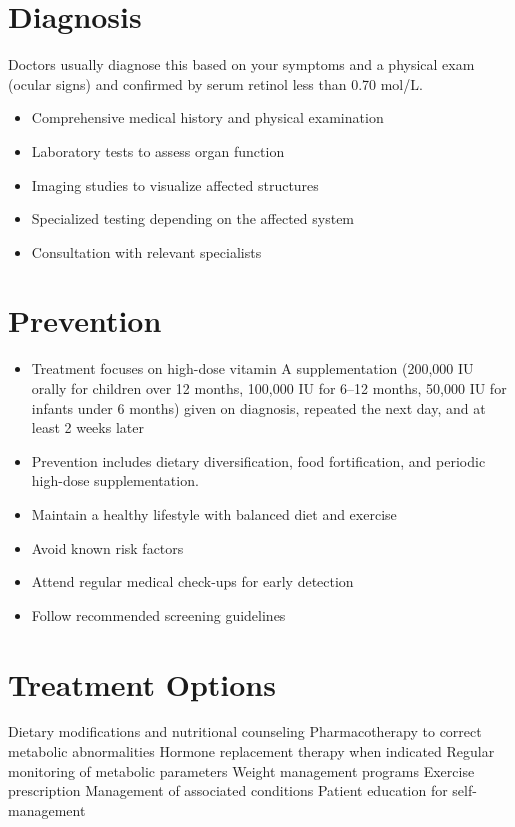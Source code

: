 \section{Diagnosis}
Doctors usually diagnose this based on your symptoms and a physical exam (ocular signs) and confirmed by serum retinol less than 0.70 \textmu mol/L.

\begin{itemize}[noitemsep]
  \item Comprehensive medical history and physical examination
  \item Laboratory tests to assess organ function
  \item Imaging studies to visualize affected structures
  \item Specialized testing depending on the affected system
  \item Consultation with relevant specialists
\end{itemize}
\section{Prevention}
\begin{itemize}[noitemsep]
  \item Treatment focuses on high-dose vitamin A supplementation (200,000 IU orally for children over 12 months, 100,000 IU for 6--12 months, 50,000 IU for infants under 6 months) given on diagnosis, repeated the next day, and at least 2 weeks later
  \item Prevention includes dietary diversification, food fortification, and periodic high-dose supplementation.
  \item Maintain a healthy lifestyle with balanced diet and exercise
  \item Avoid known risk factors
  \item Attend regular medical check-ups for early detection
  \item Follow recommended screening guidelines
\end{itemize}
\section{Treatment Options}
Dietary modifications and nutritional counseling Pharmacotherapy to correct metabolic abnormalities Hormone replacement therapy when indicated Regular monitoring of metabolic parameters Weight management programs Exercise prescription Management of associated conditions Patient education for self-management

